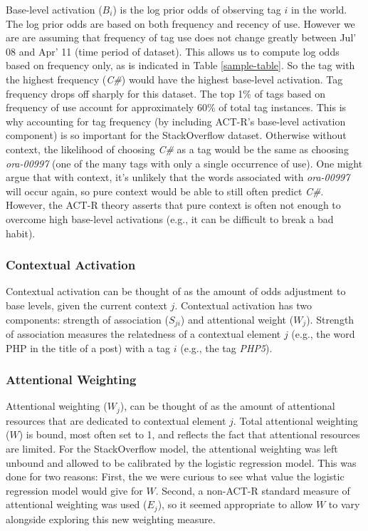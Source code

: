 \documentclass[10pt,letterpaper]{article}
\begin{document}
Base-level activation ($B_{i}$) is the log prior odds of observing tag $i$ in the world.
The log prior odds are based on both frequency and recency of use.
However we are are assuming that frequency of tag use does not change greatly between Jul' 08 and Apr' 11 (time period of dataset).
This allows us to compute log odds based on frequency only, as is indicated in Table \ref{sample-table}.
So the tag with the highest frequency (\emph{C\#}) would have the highest base-level activation.
Tag frequency drops off sharply for this dataset.
The top 1\% of tags based on frequency of use account for approximately 60\% of total tag instances.
This is why accounting for tag frequency (by including ACT-R's base-level activation component) is so important for the StackOverflow dataset.
Otherwise without context, the likelihood of choosing \emph{C\#} as a tag would be the same as choosing \emph{ora-00997} (one of the many tags with only a single occurrence of use).
One might argue that with context, it's unlikely that the words associated with \emph{ora-00997} will occur again, so pure context would be able to still often predict \emph{C\#}.
However, the ACT-R theory asserts that pure context is often not enough to overcome high base-level activations (e.g., it can be difficult to break a bad habit).

\subsubsection{Contextual Activation}

Contextual activation can be thought of as the amount of odds adjustment to base levels, given the current context $j$.
Contextual activation has two components: strength of association ($S_{ji}$) and attentional weight ($W_{j}$).
Strength of association measures the relatedness of a contextual element $j$ (e.g., the word PHP in the title of a post) with a tag $i$ (e.g., the tag \emph{PHP5}).

\subsubsection{Attentional Weighting}

Attentional weighting ($W_{j}$), can be thought of as the amount of attentional resources that are dedicated to contextual element $j$.
Total attentional weighting ($W$) is bound, most often set to 1, and reflects the fact that attentional resources are limited.
For the StackOverflow model, the attentional weighting was left unbound and allowed to be calibrated by the logistic regression model.
This was done for two reasons:
First, the we were curious to see what value the logistic regression model would give for $W$.
Second, a non-ACT-R standard measure of attentional weighting was used ($E_{j}$), so it seemed appropriate to allow $W$ to vary alongside exploring this new weighting measure. 
\end{document}
